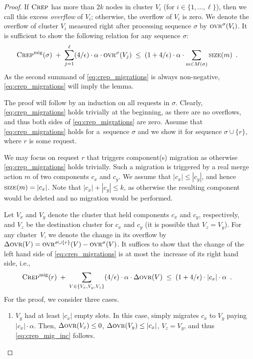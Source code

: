 \begin{proof}
If $\textsc{Crep}$ has more than $2 k$ nodes in cluster $V_i$ (for $i \in
\{1,\ldots,\ell\}$), then we call this excess \emph{overflow} of $V_i$;
otherwise, the overflow of $V_i$ is zero. We denote the overflow of cluster
$V_i$ measured right after processing sequence $\sigma$ by $\textsc{ovr}^\sigma(V_i)$.
It is sufficient to show the following relation for any sequence $\sigma$:
\begin{equation}
\label{eq:crep_migrations}
 \textsc{Crep}^\textnormal{mig}(\sigma) \;+\; \sum_{j=1}^\ell (4/\epsilon) \cdot \alpha \cdot \textsc{ovr}^\sigma(V_j) 
 \; \leq \; (1+4/\epsilon)  \cdot \alpha \cdot \sum_{m \in M(\sigma)} \textsc{size}(m) 
\enspace.
\end{equation}
As the second summand of \eqref{eq:crep_migrations} is always non-negative,
\eqref{eq:crep_migrations} will imply the lemma. 

The proof will follow by an induction on all requests in $\sigma$. Clearly,
\eqref{eq:crep_migrations} holds trivially at the beginning, as there are no
overflows, and thus both sides of \eqref{eq:crep_migrations} are zero.
Assume that \eqref{eq:crep_migrations} holds for a~sequence $\sigma$
and we show it for sequence $\sigma \cup \{ r \}$, where $r$ is some request.

We may focus on request $r$ that triggers component(s) migration as otherwise
\eqref{eq:crep_migrations} holds trivially. Such a migration is triggered by a
real merge action $m$ of two components $c_x$ and $c_y$. We assume that $|c_x|
\leq |c_y|$, and hence $\textsc{size}(m) = |c_x|$. Note that $|c_x| + |c_y| \leq k$,
as otherwise the resulting component would be deleted and no migration would
be performed.

Let $V_x$ and $V_y$ denote the cluster that held components $c_x$ and $c_y$,
respectively, and $V_z$ be the destination cluster for $c_x$ and $c_y$ (it is
possible that $V_z = V_y$). For any cluster~$V$, we denote the change in 
its overflow by $\Delta \textsc{ovr}(V) = \textsc{ovr}^{\sigma \cup \{r\}}(V) - \textsc{ovr}^\sigma(V)$. 
It suffices to show that the
change of the left hand side of \eqref{eq:crep_migrations} is at most
the~increase of its right hand side, i.e.,
\begin{equation}
\label{eq:crep_mig_inc}
\textsc{Crep}^\textnormal{mig}(r) \;+\; \sum_{V \in \{ V_x, V_y, V_z \}} (4/\epsilon) \cdot \alpha \cdot \Delta\textsc{ovr}(V) 
\;\leq\; (1+4/\epsilon) \cdot |c_x| \cdot \alpha
\enspace.
\end{equation}
For the proof, we consider three cases.

\begin{enumerate}
\item 
$V_y$ had at least $|c_x|$ empty slots. In this case, \CREP simply migrates
$c_x$ to $V_y$ paying $|c_x| \cdot \alpha$. Then, $\Delta \textsc{ovr}(V_x) \leq 0$,
$\Delta \textsc{ovr}(V_y) \leq |c_x|$, $V_z = V_y$, and thus \eqref{eq:crep_mig_inc}
follows.


\end{enumerate}
\end{proof}
